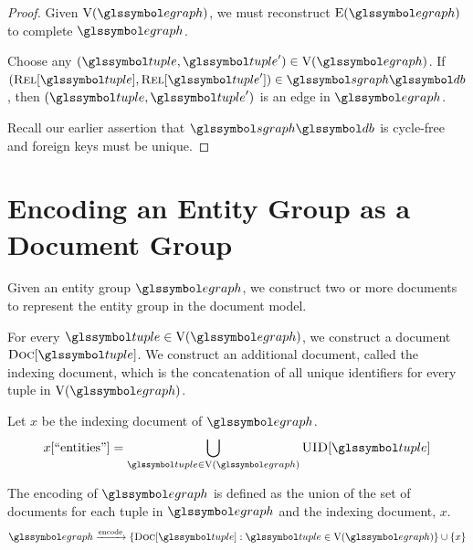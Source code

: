 		\begin{proof}
			Given \(\text{V}(\egraph)\), we must reconstruct \(\text{E}(\egraph)\) to complete \(\egraph\).
			
			Choose any \((\tuple, \tuple') \in \text{V}(\egraph)\).	If \((\relations{\tuple}, \relations{\tuple'}) \in \sgraph{\db}\), then \((\tuple, \tuple')\) is an edge in \(\egraph\).
			
			Recall our earlier assertion that \(\sgraph{\db}\) is cycle-free and foreign keys must be unique.
		\end{proof}
		
	\section{Encoding an Entity Group as a Document Group}
	\label{sec:encoding-entity-group-as-document-group}
		Given an entity group \(\egraph\), we construct two or more documents to represent the entity group in the document model.
		
		For every \(\tuple \in \text{V}(\egraph)\), we construct a document \(\docs{\tuple}\).  We construct an additional document, called the indexing document, which is the concatenation of all unique identifiers for every tuple in \(\text{V}(\egraph)\).
		
		Let \(x\) be the indexing document of \(\egraph\).
		\begin{align}
			x[\text{``entities''}] = \bigcup_{\tuple \in \text{V}\left(\egraph\right)} \uid{\tuple}
		\end{align}
		
		The encoding of \(\egraph\) is defined as the union of the set of documents for each tuple in \(\egraph\) and the indexing document, \(x\).
		\begin{align}
			\egraph \xrightarrow{\text{encode}} \{\docs{\tuple} : \tuple \in \text{V}(\egraph)\} \cup \{x\}
		\end{align}
		
